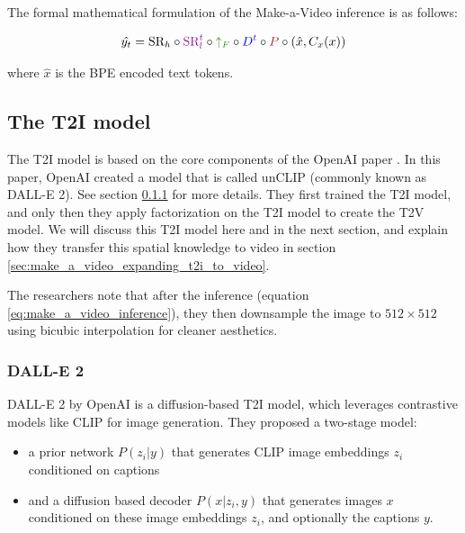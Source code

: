 The formal mathematical formulation of the Make-a-Video inference is as follows:

\begin{equation}
    \hat{y_t} = \text{SR}_h \circ \textcolor{Plum}{\text{SR}_l^t} \circ \textcolor{OliveGreen}{\uparrow_F} \circ \textcolor{blue}{D^t} \circ \textcolor{Maroon}{P} \circ \left( \hat{x}, C_x (x) \right)
    \label{eq:make_a_video_inference}
\end{equation}

where $\hat{x}$ is the BPE encoded text tokens.







\subsection{The T2I model}

The T2I model is based on the core components of the OpenAI paper \cite{dalle_2}. In this paper, OpenAI created a model that is called unCLIP (commonly known as DALL-E 2). See section \ref{sec:dalle_2} for more details. They first trained the T2I model, and only then they apply factorization on the T2I model to create the T2V model. We will discuss this T2I model here and in the next section, and explain how they transfer this spatial knowledge to video in section \ref{sec:make_a_video_expanding_t2i_to_video}.

The researchers note that after the inference (equation \ref{eq:make_a_video_inference}), they then downsample the image to $512\times 512$ using bicubic interpolation for cleaner aesthetics.







\subsubsection{DALL-E 2}
\label{sec:dalle_2}

DALL-E 2 by OpenAI \cite{dalle_2} is a diffusion-based T2I model, which leverages contrastive models like CLIP for image generation. They proposed a two-stage model: 

\begin{itemize}
    \item a prior network $P(z_i | y)$ that generates CLIP image embeddings $z_i$ conditioned on captions
    \item and a diffusion based decoder $P(x | z_i, y)$ that generates images $x$ conditioned on these image embeddings $z_i$, and optionally the captions $y$.
\end{itemize}

